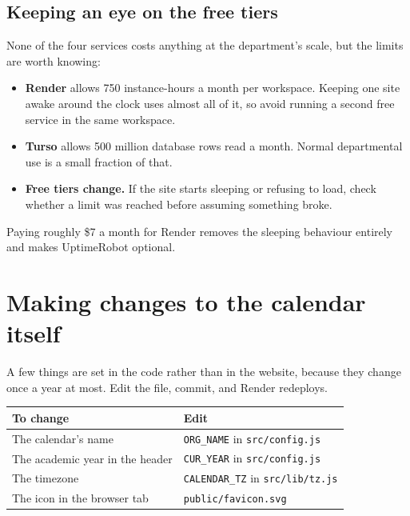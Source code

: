 \documentclass[11pt,a4paper]{article}
\newcommand{\code}[1]{\texttt{\small #1}}
\begin{document}
\subsection{Keeping an eye on the free tiers}

None of the four services costs anything at the department's scale, but the
limits are worth knowing:

\begin{itemize}
  \item \textbf{Render} allows 750 instance-hours a month per workspace. Keeping
        one site awake around the clock uses almost all of it, so avoid running
        a second free service in the same workspace.
  \item \textbf{Turso} allows 500 million database rows read a month. Normal
        departmental use is a small fraction of that.
  \item \textbf{Free tiers change.} If the site starts sleeping or refusing to
        load, check whether a limit was reached before assuming something broke.
\end{itemize}

Paying roughly \$7 a month for Render removes the sleeping behaviour entirely
and makes UptimeRobot optional.

\section{Making changes to the calendar itself}
\label{sec:changes}

A few things are set in the code rather than in the website, because they
change once a year at most. Edit the file, commit, and Render redeploys.

\vspace{0.4em}
\begin{center}
\small
\begin{tabular}{@{}>{\raggedright\arraybackslash}p{6.2cm}>{\raggedright\arraybackslash}p{8.2cm}@{}}
\toprule
\textbf{To change} & \textbf{Edit} \\
\midrule
The calendar's name & \code{ORG\_NAME} in \code{src/config.js} \\
The academic year in the header & \code{CUR\_YEAR} in \code{src/config.js} \\
The timezone & \code{CALENDAR\_TZ} in \code{src/lib/tz.js} \\
The icon in the browser tab & \code{public/favicon.svg} \\
\bottomrule
\end{tabular}
\end{center}
\end{document}
